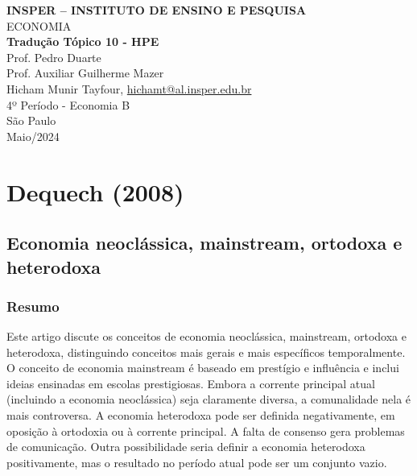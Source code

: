 \documentclass[a4paper,12pt]{article}[abntex2]
\begin{document}
\begin{titlepage}
    \centering
    \vspace*{1cm}
    \Large\textbf{INSPER – INSTITUTO DE ENSINO E PESQUISA}\\
    \Large ECONOMIA\\
    \vspace{1.5cm}
    \Large\textbf{Tradução Tópico 10 - HPE}\\
    \vspace{1.5cm}
    Prof. Pedro Duarte\\
    Prof. Auxiliar Guilherme Mazer\\
    \vfill
    \normalsize
    Hicham Munir Tayfour, \href{mailto:hichamt@al.insper.edu.br}{hichamt@al.insper.edu.br}\\
    4º Período - Economia B\\
    \vfill
    São Paulo\\
    Maio/2024
\end{titlepage}

\newpage
\tableofcontents
\thispagestyle{empty} %
\newpage
\setcounter{page}{1} %
\justify
\onehalfspacing

\pagestyle{fancy}
\fancyhf{}
\rhead{\thepage}

\section{\textbf{Dequech (2008)}}
\subsection{\textbf{Economia neoclássica, mainstream, ortodoxa e heterodoxa}}

\subsubsection{\textbf{Resumo}}
Este artigo discute os conceitos de economia neoclássica, mainstream, ortodoxa e heterodoxa, distinguindo conceitos mais gerais e mais específicos temporalmente. O conceito de economia mainstream é baseado em prestígio e influência e inclui ideias ensinadas em escolas prestigiosas. Embora a corrente principal atual (incluindo a economia neoclássica) seja claramente diversa, a comunalidade nela é mais controversa. A economia heterodoxa pode ser definida negativamente, em oposição à ortodoxia ou à corrente principal. A falta de consenso gera problemas de comunicação. Outra possibilidade seria definir a economia heterodoxa positivamente, mas o resultado no período atual pode ser um conjunto vazio.
\end{document}
